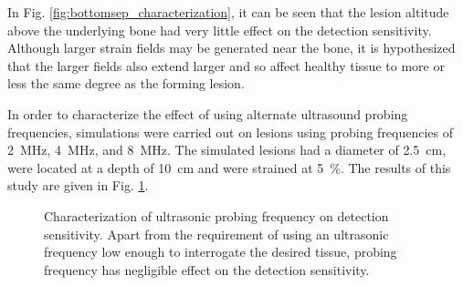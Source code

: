 			In Fig. \ref{fig:bottomsep_characterization}, it can be seen that the lesion altitude above the underlying bone had very little effect on the detection sensitivity. Although larger strain fields may be generated near the bone, it is hypothesized that the larger fields also extend larger and so affect healthy tissue to more or less the same degree as the forming lesion.

			In order to characterize the effect of using alternate ultrasound probing frequencies, simulations were carried out on lesions using probing frequencies of \SI{2}{\MHz}, \SI{4}{\MHz}, and \SI{8}{\MHz}. The simulated lesions had a diameter of \SI{2.5}{\cm}, were located at a depth of \SI{10}{\cm} and were strained at \SI{5}{\percent}. The results of this study are given in Fig. \ref{fig:freq_characterization}.

			\begin{figure}[!htb]
				\centering
				\caption[Quasi-static ultrasound probing frequency characterization]{Characterization of ultrasonic probing frequency on detection sensitivity. Apart from the requirement of using an ultrasonic frequency low enough to interrogate the desired tissue, probing frequency has negligible effect on the detection sensitivity.}
				\label{fig:freq_characterization}
			\end{figure}

